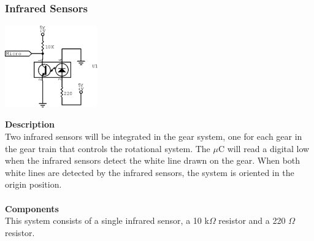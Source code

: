 \documentclass[titlepage]{article}
\begin{document}
\newpage
\subsubsection{Infrared Sensors}
\begin{center}
	\includegraphics[width = 0.3\textwidth]{IRSensor.png}
\label{fig:IRSensorFig}
\end{center}
\textbf{Description}\\
Two infrared sensors will be integrated in the gear system, one for each gear in the gear train that controls the rotational system. The $\mu$C will read a digital low when the infrared sensors detect the white line drawn on the gear. When both white lines are detected by the infrared sensors, the system is oriented in the origin position.\\\\
\textbf{Components}\\
This system consists of a single infrared sensor, a 10 k$\Omega$ resistor and a 220 $\Omega$ resistor.
\end{document}
